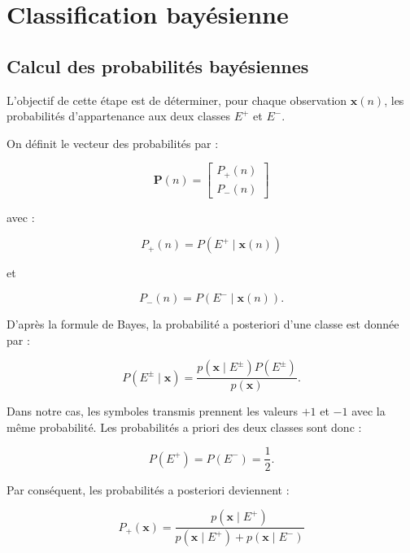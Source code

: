 

\section{Classification bayésienne}

\subsection{Calcul des probabilités bayésiennes}

L'objectif de cette étape est de déterminer, pour chaque
observation $\mathbf{x}(n)$, les probabilités d'appartenance
aux deux classes $E^+$ et $E^-$.

On définit le vecteur des probabilités par :

\begin{equation}
\mathbf{P}(n)=
\begin{bmatrix}
P_+(n)\\
P_-(n)
\end{bmatrix}
\end{equation}

avec :

\begin{equation}
P_+(n)=P(E^+\mid\mathbf{x}(n))
\end{equation}

et

\begin{equation}
P_-(n)=P(E^-\mid\mathbf{x}(n)).
\end{equation}

D'après la formule de Bayes, la probabilité a posteriori
d'une classe est donnée par :

\begin{equation}
P(E^\pm\mid\mathbf{x})=
\frac{p(\mathbf{x}\mid E^\pm)P(E^\pm)}
{p(\mathbf{x})}.
\end{equation}

Dans notre cas, les symboles transmis prennent les valeurs
$+1$ et $-1$ avec la même probabilité. Les probabilités
a priori des deux classes sont donc :

\begin{equation}
P(E^+)=P(E^-)=\frac{1}{2}.
\end{equation}

Par conséquent, les probabilités a posteriori deviennent :

\begin{equation}
P_+(\mathbf{x})=
\frac{p(\mathbf{x}\mid E^+)}
{p(\mathbf{x}\mid E^+)+p(\mathbf{x}\mid E^-)}
\end{equation}

